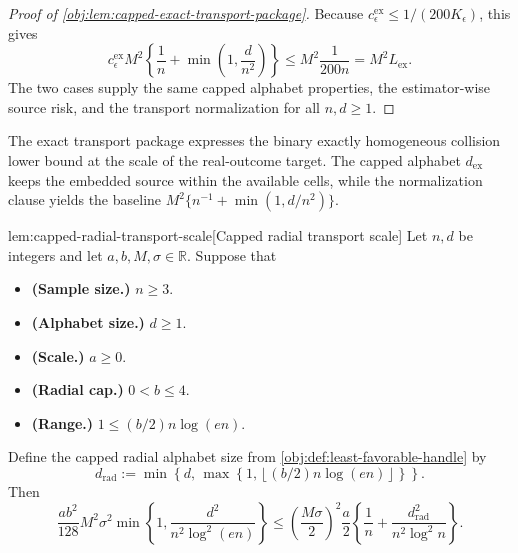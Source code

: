\documentclass[11pt]{article}
\begin{document}
\begin{proof}[Proof of \cref{obj:lem:capped-exact-transport-package}]
Because \(c_{\epsilon}^{\mathrm{ex}}\le 1/(200K_\epsilon)\), this gives
\[
c_{\epsilon}^{\mathrm{ex}}M^2
\left\{\frac1n+\min\left(1,\frac d{n^2}\right)\right\}
\le
M^2\frac1{200n}
=
M^2L_{\mathrm{ex}} .
\]
The two cases supply the same capped alphabet properties, the estimator-wise source risk, and the transport normalization for all \(n,d\ge1\). %
\end{proof}

The exact transport package expresses the binary exactly homogeneous collision lower bound at the scale of the real-outcome target. The capped alphabet \(d_{\mathrm{ex}}\) keeps the embedded source within the available cells, while the normalization clause yields the baseline \(M^2\{n^{-1}+\min(1,d/n^2)\}\).

\begin{lemmav}{lem:capped-radial-transport-scale}[Capped radial transport scale]
Let \(n,d\) be integers and let \(a,b,M,\sigma\in\mathbb R\).  Suppose that
\begin{itemize}
\item \textbf{(Sample size.)} \(n\ge 3\).
\item \textbf{(Alphabet size.)} \(d\ge 1\).
\item \textbf{(Scale.)} \(a\ge 0\).
\item \textbf{(Radial cap.)} \(0<b\le 4\).
\item \textbf{(Range.)} \(1\le (b/2)n\log(en)\).
\end{itemize}
Define the capped radial alphabet size from \cref{obj:def:least-favorable-handle} by
\[
d_{\mathrm{rad}}
:=
\min\left\{
d,\,
\max\left\{1,\left\lfloor (b/2)n\log(en)\right\rfloor\right\}
\right\}.
\]
Then
\[
\frac{ab^2}{128}M^2\sigma^2
\min\left\{1,\frac{d^2}{n^2\log^2(en)}\right\}
\le
\left(\frac{M\sigma}{2}\right)^2
\frac a2
\left\{
\frac1n+
\frac{d_{\mathrm{rad}}^2}{n^2\log^2 n}
\right\}.
\]
\end{lemmav}
\end{document}
